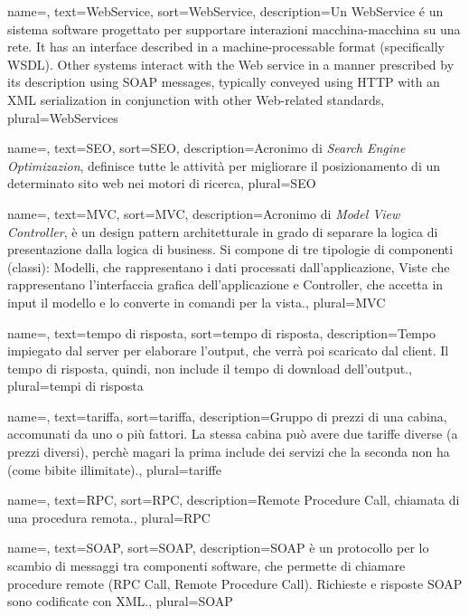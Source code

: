 {
	name=,
	text=WebService,
	sort=WebService,
	description={Un WebService é un sistema software progettato per supportare interazioni macchina-macchina su una rete. It has an interface described in a machine-processable format (specifically WSDL). Other systems interact with the Web service in a manner prescribed by its description using SOAP messages, typically conveyed using HTTP with an XML serialization in conjunction with other Web-related standards},
	plural=WebServices
}


{
	name=,
	text=SEO,
	sort=SEO,
	description={Acronimo di \textit{Search Engine Optimizazion}, definisce tutte le attività per migliorare il posizionamento di un determinato sito web nei motori di ricerca},
	plural=SEO
}


{
	name=,
	text=MVC,
	sort=MVC,
	description={Acronimo di \textit{Model View Controller}, è un design pattern architetturale in grado di separare la logica di presentazione dalla logica di business. Si compone di tre tipologie di componenti (classi): Modelli, che rappresentano i dati processati dall'applicazione, Viste che rappresentano l'interfaccia grafica dell'applicazione e Controller, che accetta in input il modello e lo converte in comandi per la vista.},
	plural=MVC
}


{
	name=,
	text=tempo di risposta,
	sort=tempo di risposta,
	description={Tempo impiegato dal server per elaborare l'output, che verrà poi scaricato dal client. Il tempo di risposta, quindi, non include il tempo di download dell'output.},
	plural=tempi di risposta
}

{
	name=,
	text=tariffa,
	sort=tariffa,
	description={Gruppo di prezzi di una cabina, accomunati da uno o più fattori. La stessa cabina può avere due tariffe diverse (a prezzi diversi), perchè magari la prima include dei servizi che la seconda non ha (come bibite illimitate).},
	plural=tariffe
}

{
	name=,
	text=RPC,
	sort=RPC,
	description={Remote Procedure Call, chiamata di una procedura remota.},
	plural=RPC
}

{
	name=,
	text=SOAP,
	sort=SOAP,
	description={SOAP è un protocollo per lo scambio di messaggi tra componenti software, che permette di chiamare procedure remote (RPC Call, Remote Procedure Call). Richieste e risposte SOAP sono codificate con XML.},
	plural=SOAP
}

